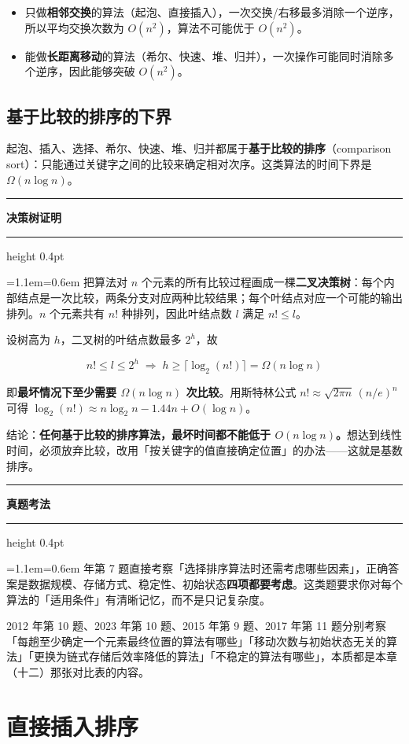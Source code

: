 \documentclass[11pt,openany,UTF8]{ctexbook}
\newcommand{\callouthead}[2]{%
  \par\addvspace{7pt}\noindent
  {\color{#1}\rule[-0.15em]{3pt}{1.05em}}\hspace{0.5em}%
  {\bfseries\color{#1}#2}\par\nobreak\vspace{-0.35em}%
  {\color{rulesep}\hrule height 0.4pt}\nobreak\vspace{0.45em}%
  \begingroup\small\setlength{\parindent}{0pt}%
  \leftskip=1.1em\rightskip=0.6em\noindent\ignorespaces}
\newcommand{\calloutend}{\par\endgroup\addvspace{7pt}}
\newenvironment{callkey}[1]{\callouthead{keybar}{#1}}{\calloutend}
\newenvironment{callexam}[1]{\callouthead{exambar}{#1}}{\calloutend}
\begin{document}
\begin{itemize}
\item 只做\textbf{相邻交换}的算法（起泡、直接插入），一次交换/右移最多消除一个逆序，所以平均交换次数为 $O(n^2)$，算法不可能优于 $O(n^2)$。
\item 能做\textbf{长距离移动}的算法（希尔、快速、堆、归并），一次操作可能同时消除多个逆序，因此能够突破 $O(n^2)$。
\end{itemize}
\subsection{基于比较的排序的下界}

起泡、插入、选择、希尔、快速、堆、归并都属于\textbf{基于比较的排序}（comparison sort）：只能通过关键字之间的比较来确定相对次序。这类算法的时间下界是 $\Omega(n\log n)$。

\begin{callkey}{决策树证明}
把算法对 $n$ 个元素的所有比较过程画成一棵\textbf{二叉决策树}：每个内部结点是一次比较，两条分支对应两种比较结果；每个叶结点对应一个可能的输出排列。$n$ 个元素共有 $n!$ 种排列，因此叶结点数 $l$ 满足 $n!\le l$。

设树高为 $h$，二叉树的叶结点数最多 $2^h$，故

\[n!\le l\le 2^h \;\Longrightarrow\; h\ge \lceil \log_2(n!)\rceil =\Omega(n\log n)\]

即\textbf{最坏情况下至少需要 $\Omega(n\log n)$ 次比较}。用斯特林公式 $n!\approx\sqrt{2\pi n}\,(n/e)^n$ 可得 $\log_2(n!)\approx n\log_2 n-1.44n+O(\log n)$。

结论：\textbf{任何基于比较的排序算法，最坏时间都不能低于 $O(n\log n)$。}想达到线性时间，必须放弃比较，改用「按关键字的值直接确定位置」的办法——这就是基数排序。

\end{callkey}

\begin{callexam}{真题考法}
2019 年第 7 题直接考察「选择排序算法时还需考虑哪些因素」，正确答案是数据规模、存储方式、稳定性、初始状态\textbf{四项都要考虑}。这类题要求你对每个算法的「适用条件」有清晰记忆，而不是只记复杂度。

2012 年第 10 题、2023 年第 10 题、2015 年第 9 题、2017 年第 11 题分别考察「每趟至少确定一个元素最终位置的算法有哪些」「移动次数与初始状态无关的算法」「更换为链式存储后效率降低的算法」「不稳定的算法有哪些」，本质都是本章（十二）那张对比表的内容。

\end{callexam}

\section{直接插入排序}
\end{document}
